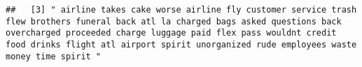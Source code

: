 \documentclass[
]{article}
\begin{document}
\begin{verbatim}
##   [3] " airline takes cake worse airline fly customer service trash flew brothers funeral back atl la charged bags asked questions back overcharged proceeded charge luggage paid flex pass wouldnt credit food drinks flight atl airport spirit unorganized rude employees waste money time spirit "                                                                                                                                                                                                                                                                                                                                                                                                                                                                                                                                                                                                                                                                                                                                                                                                                                                                                                                                                                                                                                                                                                                                                                                                                                                                                                                                                                                                                                                                                                 

\end{verbatim}
\end{document}
